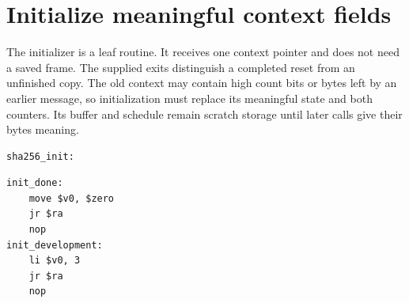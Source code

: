 \section{Initialize meaningful context fields}
The initializer is a leaf routine. It receives one context pointer and does not need a
saved frame. The supplied exits distinguish a completed reset from an unfinished copy.
The old context may contain high count bits or bytes left by an earlier message, so
initialization must replace its meaningful state and both counters. Its buffer and
schedule remain scratch storage until later calls give their bytes meaning.

\begin{verbatim}
sha256_init:
\end{verbatim}

\begin{verbatim}
init_done:
    move $v0, $zero
    jr $ra
    nop
init_development:
    li $v0, 3
    jr $ra
    nop

\end{verbatim}
